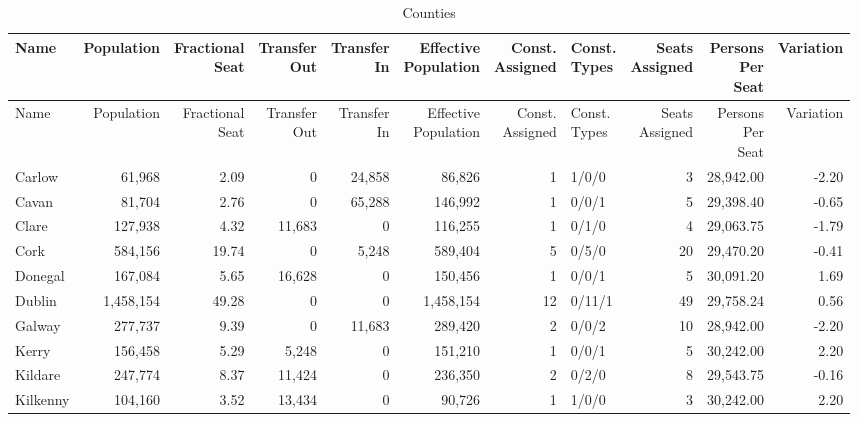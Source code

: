 \documentclass[a4paper]{article}
\begin{document}
\begin{longtable}{lrrrrrrlrrr}
\caption{Counties}
\\ \toprule
Name &Population &\shortstack{Fractional\\Seat} &\shortstack{Transfer\\Out} &\shortstack{Transfer\\In} &\shortstack{Effective\\Population} &\shortstack{Const.\\Assigned} &\shortstack{Const.\\Types} &\shortstack{Seats\\Assigned} &\shortstack{Persons\\Per\\Seat} &Variation \\ \midrule
\endfirsthead
\toprule
Name &Population &\shortstack{Fractional\\Seat} &\shortstack{Transfer\\Out} &\shortstack{Transfer\\In} &\shortstack{Effective\\Population} &\shortstack{Const.\\Assigned} &\shortstack{Const.\\Types} &\shortstack{Seats\\Assigned} &\shortstack{Persons\\Per\\Seat} &Variation \\ \midrule
\endhead
\bottomrule
\endfoot
Carlow&61,968& 2.09&0&24,858&86,826&1&1/0/0&3&28,942.00&-2.20\\ 
Cavan&81,704& 2.76&0&65,288&146,992&1&0/0/1&5&29,398.40&-0.65\\ 
Clare&127,938& 4.32&11,683&0&116,255&1&0/1/0&4&29,063.75&-1.79\\ 
Cork&584,156&19.74&0&5,248&589,404&5&0/5/0&20&29,470.20&-0.41\\ 
Donegal&167,084& 5.65&16,628&0&150,456&1&0/0/1&5&30,091.20& 1.69\\ 
Dublin&1,458,154&49.28&0&0&1,458,154&12&0/11/1&49&29,758.24& 0.56\\ 
Galway&277,737& 9.39&0&11,683&289,420&2&0/0/2&10&28,942.00&-2.20\\ 
Kerry&156,458& 5.29&5,248&0&151,210&1&0/0/1&5&30,242.00& 2.20\\ 
Kildare&247,774& 8.37&11,424&0&236,350&2&0/2/0&8&29,543.75&-0.16\\ 
Kilkenny&104,160& 3.52&13,434&0&90,726&1&1/0/0&3&30,242.00& 2.20\\ 

\end{longtable}
\end{document}

